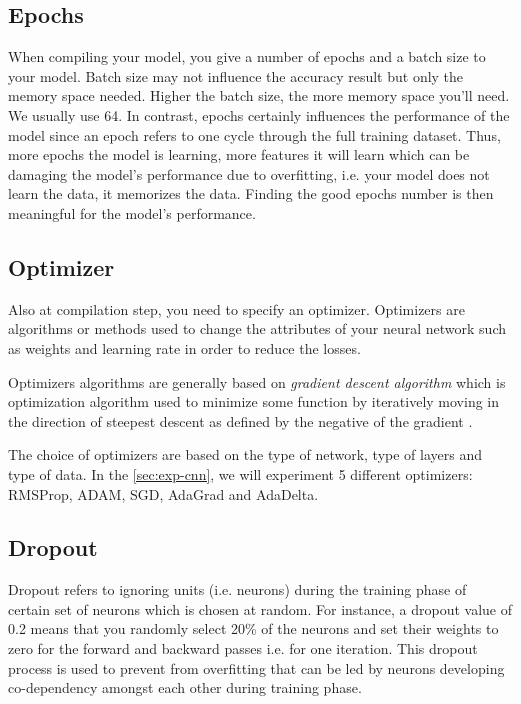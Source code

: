 \documentclass[11pt, openany]{report}
\theoremstyle{plain}
\theoremstyle{definition}
\theoremstyle{remark}
\begin{document}
\subsection{Epochs}
When compiling your model, you give a number of epochs and a batch size to your model. Batch size may not influence the accuracy result but only the memory space needed. Higher the batch size, the more memory space you'll need. We usually use 64. In contrast, epochs certainly influences the performance of the model since an epoch refers to one cycle through the full training dataset. Thus, more epochs the model is learning, more features it will learn which can be damaging the model's performance due to overfitting, i.e. your model does not learn the data, it memorizes the data. Finding the good epochs number is then meaningful for the model's performance. 


\subsection{Optimizer}
Also at compilation step, you need to specify an optimizer. Optimizers are algorithms or methods used to change the attributes of your neural network such as weights and learning rate in order to reduce the losses. 

Optimizers algorithms are generally based on \textit{gradient descent algorithm} which is optimization algorithm used to minimize some function by iteratively moving in the direction of steepest descent as defined by the negative of the gradient \cite{gradient}. 

The choice of optimizers are based on the type of network, type of layers and type of data. In the \autoref{sec:exp-cnn}, we will experiment 5 different optimizers: RMSProp, ADAM, SGD, AdaGrad and AdaDelta. %

\subsection{Dropout} \label{sec:dropout-cifar}
Dropout refers to ignoring units (i.e. neurons) during the training phase of certain set of neurons which is chosen at random. For instance, a dropout value of 0.2 means that you randomly select 20\% of the neurons and set their weights to zero for the forward and backward passes i.e. for one iteration. This dropout process is used to prevent from overfitting that can be led by neurons developing co-dependency amongst each other during training phase. 
\end{document}
